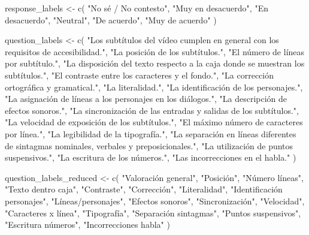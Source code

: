 \documentclass[
  12pt,
  a4paper,
  extrafontsizes,
  onecolumn,
  openright]{memoir}
\newenvironment{Shaded}{\begin{snugshade}}{\end{snugshade}}
\newcommand{\FunctionTok}[1]{\textcolor[rgb]{0.28,0.35,0.67}{#1}}
\newcommand{\NormalTok}[1]{\textcolor[rgb]{0.00,0.23,0.31}{#1}}
\newcommand{\OtherTok}[1]{\textcolor[rgb]{0.00,0.23,0.31}{#1}}
\newcommand{\StringTok}[1]{\textcolor[rgb]{0.13,0.47,0.30}{#1}}
\begin{document}
\begin{Shaded}
\begin{Highlighting}[]
\NormalTok{response\_labels }\OtherTok{\textless{}{-}} \FunctionTok{c}\NormalTok{(}
    \StringTok{"No sé / No contesto"}\NormalTok{,}
    \StringTok{"Muy en desacuerdo"}\NormalTok{,}
    \StringTok{"En desacuerdo"}\NormalTok{,}
    \StringTok{"Neutral"}\NormalTok{,}
    \StringTok{"De acuerdo"}\NormalTok{,}
    \StringTok{"Muy de acuerdo"}
\NormalTok{)}

\NormalTok{question\_labels }\OtherTok{\textless{}{-}} \FunctionTok{c}\NormalTok{(}
    \StringTok{"Los subtítulos del vídeo cumplen en general con los requisitos de accesibilidad."}\NormalTok{,}
    \StringTok{"La posición de los subtítulos."}\NormalTok{,}
    \StringTok{"El número de líneas por subtítulo."}\NormalTok{,}
    \StringTok{"La disposición del texto respecto a la caja donde se muestran los subtítulos."}\NormalTok{,}
    \StringTok{"El contraste entre los caracteres y el fondo."}\NormalTok{,}
    \StringTok{"La corrección ortográfica y gramatical."}\NormalTok{,}
    \StringTok{"La literalidad."}\NormalTok{,}
    \StringTok{"La identificación de los personajes."}\NormalTok{,}
    \StringTok{"La asignación de líneas a los personajes en los diálogos."}\NormalTok{,}
    \StringTok{"La descripción de efectos sonoros."}\NormalTok{,}
    \StringTok{"La sincronización de las entradas y salidas de los subtítulos."}\NormalTok{,}
    \StringTok{"La velocidad de exposición de los subtítulos."}\NormalTok{,}
    \StringTok{"El máximo número de caracteres por línea."}\NormalTok{,}
    \StringTok{"La legibilidad de la tipografía."}\NormalTok{,}
    \StringTok{"La separación en líneas diferentes de sintagmas nominales, verbales y preposicionales."}\NormalTok{,}
    \StringTok{"La utilización de puntos suspensivos."}\NormalTok{,}
    \StringTok{"La escritura de los números."}\NormalTok{,}
    \StringTok{"Las incorrecciones en el habla."}
\NormalTok{)}

\NormalTok{question\_labels\_reduced }\OtherTok{\textless{}{-}} \FunctionTok{c}\NormalTok{(}
    \StringTok{"Valoración general"}\NormalTok{,}
    \StringTok{"Posición"}\NormalTok{,}
    \StringTok{"Número líneas"}\NormalTok{,}
    \StringTok{"Texto dentro caja"}\NormalTok{,}
    \StringTok{"Contraste"}\NormalTok{,}
    \StringTok{"Corrección"}\NormalTok{,}
    \StringTok{"Literalidad"}\NormalTok{,}
    \StringTok{"Identificación personajes"}\NormalTok{,}
    \StringTok{"Líneas/personajes"}\NormalTok{,}
    \StringTok{"Efectos sonoros"}\NormalTok{,}
    \StringTok{"Sincronización"}\NormalTok{,}
    \StringTok{"Velocidad"}\NormalTok{,}
    \StringTok{"Caracteres x línea"}\NormalTok{,}
    \StringTok{"Tipografía"}\NormalTok{,}
    \StringTok{"Separación sintagmas"}\NormalTok{,}
    \StringTok{"Puntos suspensivos"}\NormalTok{,}
    \StringTok{"Escritura números"}\NormalTok{,}
    \StringTok{"Incorrecciones habla"}
\NormalTok{)}


\end{Highlighting}
\end{Shaded}
\end{document}
